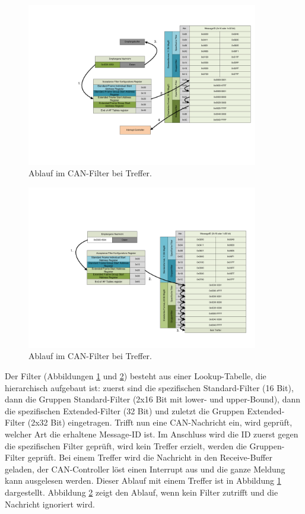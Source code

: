 \begin{figure}
	\centering
		\includegraphics[width=0.9\textwidth]{images/canfilterhit.pdf}
	\caption{Ablauf im CAN-Filter bei Treffer.}
	\label{fig.canfilterhit}
\end{figure}

\begin{figure}
	\centering
		\includegraphics[width=0.9\textwidth]{images/canfiltermiss.pdf}
	\caption{Ablauf im CAN-Filter bei Treffer.}
	\label{fig.canfiltermiss}
\end{figure}

Der Filter (Abbildungen \ref{fig.canfilterhit} und \ref{fig.canfiltermiss}) besteht aus einer Lookup-Tabelle, die hierarchisch aufgebaut ist: zuerst sind die spezifischen Standard-Filter (16 Bit), dann die Gruppen Standard-Filter (2x16 Bit mit lower- und upper-Bound), dann die spezifischen Extended-Filter (32 Bit) und zuletzt die Gruppen Extended-Filter (2x32 Bit) eingetragen. Trifft nun eine CAN-Nachricht ein, wird geprüft, welcher Art die erhaltene Message-ID ist. Im Anschluss wird die ID zuerst gegen die spezifischen Filter geprüft, wird kein Treffer erzielt, werden die Gruppen-Filter geprüft. Bei einem Treffer wird die Nachricht in den Receive-Buffer geladen, der CAN-Controller löst einen Interrupt aus und die ganze Meldung kann ausgelesen werden. Dieser Ablauf mit einem Treffer ist in Abbildung \ref{fig.canfilterhit} dargestellt. Abbildung \ref{fig.canfiltermiss} zeigt den Ablauf, wenn kein Filter zutrifft und die Nachricht ignoriert wird.

